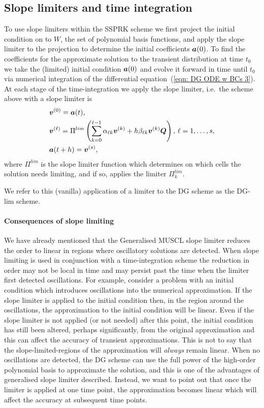 \subsection{Slope limiters and time integration}\label{subsec: slope lim and int}
To use slope limiters within the SSPRK scheme we first project the initial condition on to \(W\), the set of polynomial basis functions, and apply the slope limiter to the projection to determine the initial coefficients \(\boldsymbol a(0)\). To find the coefficients for the approximate solution to the transient distribution at time \(t_0\) we take the (limited) initial condition \(\boldsymbol a(0)\) and evolve it forward in time until \(t_0\) via numerical integration of the differential equation~(\ref{eqn: DG ODE w BCs 3}). At each stage of the time-integration we apply the slope limiter, i.e.~the scheme above with a slope limiter is 
\begin{align*}
	&\boldsymbol v^{(0)} = \boldsymbol a(t),\\
	&\boldsymbol v^{(\ell)} = \Pi^{lim}\left(\sum_{k=0}^{\ell-1} \alpha_{\ell k}\boldsymbol v^{(k)} + h\beta_{\ell k}  \boldsymbol v^{(k)}\boldsymbol Q\right),\, \ell = 1,\dots,s,\\
	&\boldsymbol a(t+h) =\boldsymbol v^{(s)},
\end{align*} 
where \(\Pi^{lim}\) is the slope limiter function which determines on which cells the solution needs limiting, and if so, applies the limiter \(\Pi_k^{lim}\). 

We refer to this (vanilla) application of a limiter to the DG scheme as the DG-lim scheme. 

\paragraph{Consequences of slope limiting} We have already mentioned that the Generalised MUSCL slope limiter reduces the order to linear in regions where oscillatory solutions are detected. When slope limiting is used in conjunction with a time-integration scheme the reduction in order may not be local in time and may persist past the time when the limiter first detected oscillations. For example, consider a problem with an initial condition which introduces oscillations into the numerical approximation. If the slope limiter is applied to the initial condition then, in the region around the oscillations, the approximation to the initial condition will be linear. Even if the slope limiter is not applied (or not needed) after this point, the initial condition has still been altered, perhaps significantly, from the original approximation and this can affect the accuracy of transient approximations. This is not to say that the slope-limited-regions of the approximation will \emph{always} remain linear. When no oscillations are detected, the DG scheme can use the full power of the high-order polynomial basis to approximate the solution, and this is one of the advantages of generalised slope limiter described. Instead, we want to point out that once the limiter is applied at one time point, the approximation becomes linear which will affect the accuracy at subsequent time points. 

